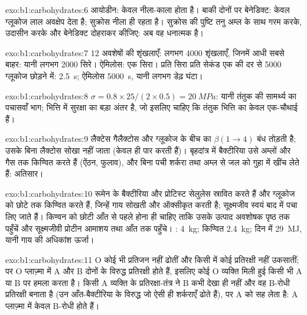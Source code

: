 \begin{solution}{exo:b1:carbohydrates:6}
आयोडीन: केवल  नीला-काला होता है। बाकी दोनों पर बेनेडिक्ट: केवल
ग्लूकोज लाल अवक्षेप देता है; सुक्रोस नीला ही रहता है। सुक्रोस की पुष्टि
तनु अम्ल के साथ गरम करके, उदासीन करके और बेनेडिक्ट दोहराकर कीजिए: अब वह
धनात्मक है।
\end{solution}

\begin{solution}{exo:b1:carbohydrates:7}
12 अवशेषों की शृंखलाएँ: लगभग \num{4000} शृंखलाएँ, जिनमें आधी सबसे बाहर:
यानी लगभग \num{2000} सिरे। ऐमिलोस: एक सिरा। प्रति सिरा प्रति सेकंड एक की
दर से \num{5000} ग्लूकोज छोड़ने में:  \qty{2.5}{s}; ऐमिलोस
\qty{5000}{s}, यानी लगभग डेढ़ घंटा।
\end{solution}

\begin{solution}{exo:b1:carbohydrates:8}
$\sigma = 0.8\times 25/(2\times 0.5) = \qty{20}{MPa}$: यानी तंतुक की
सामर्थ्य का पचासवाँ भाग; भित्ति में सुरक्षा का बड़ा अंतर है, जो इसलिए
चाहिए कि तंतुक भित्ति का केवल एक-चौथाई हैं।
\end{solution}

\begin{solution}{exo:b1:carbohydrates:9}
लैक्टेस गैलैक्टोस और ग्लूकोज के बीच का $\beta(1{\to}4)$ बंध तोड़ती है;
उसके बिना लैक्टोस सोखा नहीं जाता (केवल  ही  पार करती हैं)।
बृहदांत्र में बैक्टीरिया उसे अम्लों और गैस तक किण्वित करते हैं
(ऐंठन, फुलाव), और बिना पची शर्करा तथा अम्ल  से जल को गुहा में खींच
लेते हैं: अतिसार।
\end{solution}

\begin{solution}{exo:b1:carbohydrates:10}
रूमेन के बैक्टीरिया और प्रोटिस्ट सेलुलेस स्रावित करते हैं और ग्लूकोज को
छोटे  तक किण्वित करते हैं, जिन्हें गाय सोखती और ऑक्सीकृत करती
है; सूक्ष्मजीव स्वयं बाद में पचा लिए जाते हैं। किण्वन को छोटी आँत से पहले
होना ही चाहिए ताकि उसके उत्पाद अवशोषक पृष्ठ तक पहुँचें और सूक्ष्मजीवी
प्रोटीन आमाशय तथा आँत तक पहुँचे। :
\qty{4}{kg}; किण्वित \qty{2.4}{kg}; दिन में \qty{29}{MJ}, यानी गाय की
अधिकांश ऊर्जा।
\end{solution}

\begin{solution}{exo:b1:carbohydrates:11}
O  कोई भी प्रतिजन नहीं ढोतीं और किसी में कोई प्रतिरक्षी नहीं
उकसातीं; पर O प्लाज़्मा में A और B दोनों के विरुद्ध प्रतिरक्षी होते हैं,
इसलिए कोई O व्यक्ति मिली हुई किसी भी A या B  पर हमला करता है। किसी
A व्यक्ति के प्रतिरक्षा-तंत्र ने B कभी देखा ही नहीं और वह B-रोधी
प्रतिरक्षी बनाता है (उन आँत-बैक्टीरिया के विरुद्ध जो ऐसी ही शर्कराएँ ढोते
हैं), पर A को सह लेता है: A प्लाज़्मा में केवल B-रोधी होते हैं।
\end{solution}

